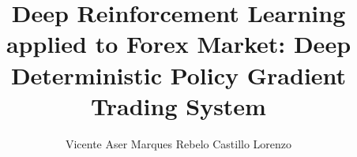 \documentclass[a4paper]{article}
\begin{document}
\title{Deep Reinforcement Learning applied to Forex Market: Deep Deterministic Policy Gradient Trading System}
\author{Vicente Aser Marques Rebelo Castillo Lorenzo}

\maketitle
\thispagestyle{empty}

\setlength{\abstitleskip}{-\absparindent}


\tableofcontents
\thispagestyle{empty}
\clearpage















\clearpage
{}
\normalem

\ULforem

\end{document}
